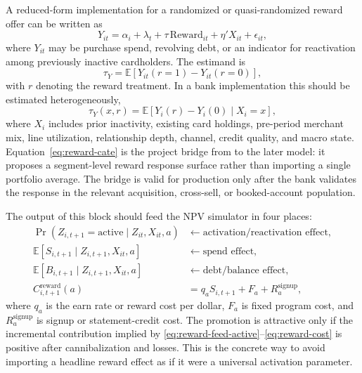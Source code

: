 \documentclass[11pt]{article}
\newcommand{\E}{\mathbb{E}}
\newcommand{\1}{\mathbf{1}}
\begin{document}
A reduced-form implementation for a randomized or quasi-randomized reward offer
can be written as
\begin{equation}
  Y_{it}
  =
  \alpha_i + \lambda_t
  + \tau\,\mathrm{Reward}_{it}
  + \eta' X_{it}
  + \epsilon_{it},
  \label{eq:rewards-treatment}
\end{equation}
where $Y_{it}$ may be purchase spend, revolving debt, or an indicator for
reactivation among previously inactive cardholders. The estimand is
\begin{equation}
  \tau_Y
  =
  \E[Y_{it}(r=1)-Y_{it}(r=0)],
  \label{eq:reward-ate}
\end{equation}
with $r$ denoting the reward treatment. In a bank implementation this should be
estimated heterogeneously,
\begin{equation}
  \tau_Y(x,r)
  =
  \E[Y_i(r)-Y_i(0)\mid X_i=x],
  \label{eq:reward-cate}
\end{equation}
where $X_i$ includes prior inactivity, existing card holdings, pre-period
merchant mix, line utilization, relationship depth, channel, credit quality, and
macro state. Equation~\eqref{eq:reward-cate} is the project bridge from
\citet{agarwal2010rewards} to the later model: it proposes a segment-level
reward response surface rather than importing a single portfolio average. The
bridge is valid for production only after the bank validates the response in
the relevant acquisition, cross-sell, or booked-account population.

The output of this block should feed the NPV simulator in four places:
\begin{align}
  \Pr(Z_{i,t+1}=\mathrm{active}\mid Z_{it},X_{it},a)
    &\leftarrow
      \text{activation/reactivation effect}, \label{eq:reward-feed-active}\\
  \E[S_{i,t+1}\mid Z_{i,t+1},X_{it},a]
    &\leftarrow
      \text{spend effect}, \label{eq:reward-feed-spend}\\
  \E[B_{i,t+1}\mid Z_{i,t+1},X_{it},a]
    &\leftarrow
      \text{debt/balance effect}, \label{eq:reward-feed-balance}\\
  C^{\mathrm{reward}}_{i,t+1}(a)
    &= q_a S_{i,t+1} + F_a + R^{\mathrm{signup}}_a,
      \label{eq:reward-cost}
\end{align}
where $q_a$ is the earn rate or reward cost per dollar, $F_a$ is fixed program
cost, and $R^{\mathrm{signup}}_a$ is signup or statement-credit cost. The
promotion is attractive only if the incremental contribution implied by
\eqref{eq:reward-feed-active}--\eqref{eq:reward-cost} is positive after
cannibalization and losses. This is the concrete way to avoid importing a
headline reward effect as if it were a universal activation parameter.
\end{document}
